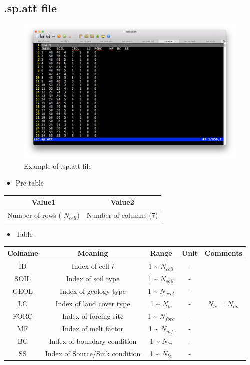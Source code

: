 \documentclass[
]{scrbook}
\providecommand{\tightlist}{%
  \setlength{\itemsep}{0pt}\setlength{\parskip}{0pt}}
\begin{document}
\hypertarget{sp.att-file}{%
\subsection{.sp.att file}\label{sp.att-file}}

\begin{figure}
\centering
\includegraphics{Fig/IO/sp.att.png}
\caption{Example of .sp.att file}
\end{figure}

\begin{itemize}
\tightlist
\item
  Pre-table
\end{itemize}

\begin{longtable}[]{@{}cc@{}}
\toprule
Value1 & Value2\tabularnewline
\midrule
\endhead
Number of rows ( \(N_{cell}\)) & Number of columns (\(7\))\tabularnewline
\bottomrule
\end{longtable}

\begin{itemize}
\tightlist
\item
  Table
\end{itemize}

\begin{longtable}[]{@{}ccccc@{}}
\toprule
Colname & Meaning & Range & Unit & Comments\tabularnewline
\midrule
\endhead
ID & Index of cell \(i\) & 1 \textasciitilde{} \(N_{cell}\) & - &\tabularnewline
SOIL & Index of soil type & 1 \textasciitilde{} \(N_{soil}\) & - &\tabularnewline
GEOL & Index of geology type & 1 \textasciitilde{} \(N_{geol}\) & - &\tabularnewline
LC & Index of land cover type & 1 \textasciitilde{} \(N_{lc}\) & - & \(N_{lc}\) = \(N_{lai}\)\tabularnewline
FORC & Index of forcing site & 1 \textasciitilde{} \(N_{forc}\) & - &\tabularnewline
MF & Index of melt factor & 1 \textasciitilde{} \(N_{mf}\) & - &\tabularnewline
BC & Index of boundary condition & 1 \textasciitilde{} \(N_{bc}\) & - &\tabularnewline
SS & Index of Source/Sink condition & 1 \textasciitilde{} \(N_{bc}\) & - &\tabularnewline
\bottomrule
\end{longtable}
\end{document}
